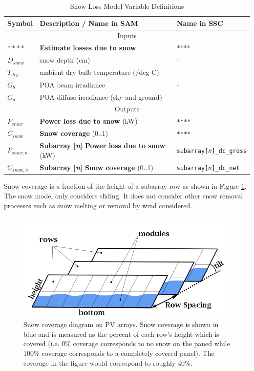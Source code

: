 \documentclass[12pt,letterpaper]{article}
\begin{document}
\begin{table}
\begin{center}
\caption{Snow Loss Model Variable Definitions}
\begin{tabular}{lll}
\midrule
Symbol & Description / \textbf{Name in SAM} & Name in SSC \\
\midrule
\multicolumn{3}{c}{Inputs}\\
$****$ & \textbf{Estimate losses due to snow} & **** \\
$D_{snow}$ & snow depth (cm) & - \\
$T_{dry}$ & ambient dry bulb temperature (/deg C) & - \\
$G_{b}$ & POA beam irradiance & - \\
$G_{d}$ & POA diffuse irradiance (sky and ground) & - \\
\midrule
\multicolumn{3}{c}{Outputs}\\
$P_{snow}$ & \textbf{Power loss due to snow} (kW) & \texttt{****} \\
$C_{snow}$ & \textbf{Snow coverage} (0..1) & \texttt{****} \\
$P_{snow,n}$ & \textbf{Subarray [\textit{n}] Power loss due to snow} (kW) &  \texttt{subarray[\textit{n}]\_dc\_gross} \\
$C_{snow,n}$ & \textbf{Subarray [\textit{n}] Snow coverage} (0..1) &  \texttt{subarray[\textit{n}]\_dc\_net} \\
\hline
\end{tabular}
\label{tab-snowvars}
\end{center}
\end{table}

Snow coverage is a fraction of the height of a subarray row as shown in Figure \ref{fig-snowCoverage}. The snow model only considers sliding. It does not consider other snow removal processes such as snow melting or removal by wind considered.

\begin{figure}
\begin{center}
\includegraphics[scale=0.5]{snow-coverage-diagram}
\caption{Snow coverage diagram on PV arrays. Snow coverage is shown in blue and is measured as the percent of each row's height which is covered (i.e. 0\% coverage corresponds to no snow on the paned while 100\% coverage corresponds to a completely covered panel). The coverage in the figure would correspond to roughly 40\%.}
\label{fig-snowCoverage}
\end{center}
\end{figure}
\end{document}
